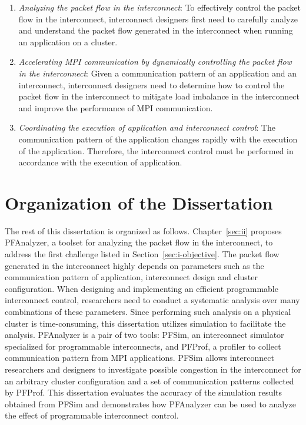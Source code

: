 \begin{enumerate}
\item \emph{Analyzing the packet flow in the interconnect}:
    To effectively control the packet flow in the interconnect, interconnect
    designers first need to carefully analyze and understand the packet flow
    generated in the interconnect when running an application on a cluster.
\item \emph{Accelerating MPI communication by dynamically controlling the
    packet flow in the interconnect}:
    Given a communication pattern of an application and an interconnect,
    interconnect designers need to determine how to control the packet flow in
    the interconnect to mitigate load imbalance in the interconnect and
    improve the performance of MPI communication.
\item \emph{Coordinating the execution of application and interconnect control}:
    The communication pattern of the application changes rapidly with the
    execution of the application. Therefore, the interconnect control must
    be performed in accordance with the execution of application.
\end{enumerate}

\section{Organization of the Dissertation}

The rest of this dissertation is organized as follows.
Chapter~\ref{sec:ii} proposes PFAnalyzer, a toolset for analyzing the
packet flow in the interconnect, to address the first challenge listed in
Section~\ref{sec:i-objective}. The packet flow generated in the interconnect
highly depends on parameters such as the communication pattern of application,
interconnect design and cluster configuration. When designing and implementing
an efficient programmable interconnect control, researchers need to conduct a
systematic analysis over many combinations of these parameters. Since
performing such analysis on a physical cluster is time-consuming, this
dissertation utilizes simulation to facilitate the analysis. PFAnalyzer is a
pair of two tools: PFSim, an interconnect simulator specialized for
programmable interconnects, and PFProf, a profiler to collect communication
pattern from MPI applications. PFSim allows interconnect researchers and
designers to investigate possible congestion in the interconnect for an
arbitrary cluster configuration and a set of communication patterns collected
by PFProf. This dissertation evaluates the accuracy of the simulation results
obtained from PFSim and demonstrates how PFAnalyzer can be used to analyze the
effect of programmable interconnect control.

